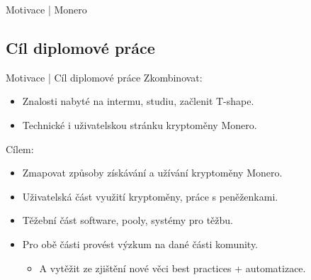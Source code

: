 \documentclass{beamer}
\begin{document}
\begin{darkframes}
\begin{frame}{Motivace | Monero}
    \end{frame}
    \subsection{Cíl diplomové práce}
    \begin{frame}{Motivace | Cíl diplomové práce}
     Zkombinovat:
     \begin{itemize}
     \item Znalosti nabyté na intermu, studiu, začlenit T-shape.
     \item Technické i uživatelskou stránku kryptoměny Monero.
     \end{itemize}
     	Cílem:
		\begin{itemize}
		\item Zmapovat způsoby získávání a užívání kryptoměny Monero.
		\item Uživatelská část \textemdash  využití kryptoměny, práce s peněženkami.
		\item Těžební část \textemdash  software, pooly, systémy pro těžbu.
		\item Pro obě části \textemdash  provést výzkum na dané části komunity.
		\begin{itemize}
		\item A vytěžit ze zjištění nové věci \textemdash  best practices + automatizace.
		\end{itemize}
		\end{itemize}
    \end{frame}
  \end{darkframes}

    
\end{document}
